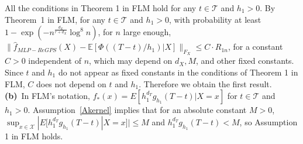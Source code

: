 \documentclass[lettersize, 12pt]{article}
\begin{document}
All the conditions in Theorem 1 in FLM hold for any $t\in\mathcal{T}$ and $h_1 > 0$.
By Theorem~1 in FLM,  
for any $t\in\mathcal{T}$ and $h_1 > 0$, with probability at least $1-\exp(-n^{\frac{d_X}{r+d_X}} \log^8n)$, for $n$ large enough,   
$\big\|\hat f_{MLP-ReGPS}(X)-\mathbb{E}[\Phi((T-t)/h_1)|X]\big\|_{F_{X}} \leq C \cdot R_{1n}$, 
 for a constant $C > 0$ independent of $n$, which may depend on $d_X, M$, and other fixed constants.
 Since $t$ and $h_1$ do not appear as fixed constants in the conditions of Theorem 1 in FLM,
 $C$ does not depend on $t$ and $h_1$.
 Therefore we obtain the first result.
\\[5pt]
\textbf{(b)}\
In FLM's notation, $f_\ast(x) = E[h_1^{d_T} g_{h_1}(T-t)|X=x]$ for $t\in\mathcal{T}$ and $h_1 > 0$.
Assumption~\ref{Akernel} implies that for an absolute constant $M > 0$, $\sup_{x\in\mathcal{X}}| E[h_1^{d_T} g_{h_1}(T-t)|X=x] | \leq M$ and $h_1^{d_T} g_{h_1}(T-t) < M$, so Assumption 1 in FLM holds. 
\end{document}
